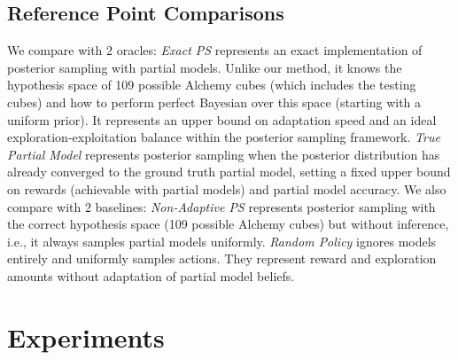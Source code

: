 \documentclass[sigconf]{aamas}
\begin{document}
\subsection{Reference Point Comparisons}\label{sec:refer-point-comp}
We compare with 2 oracles: \textit{Exact PS} represents an exact implementation of posterior sampling with partial models. Unlike our method, it knows the hypothesis space of 109 possible Alchemy cubes (which includes the testing cubes) and how to perform perfect Bayesian over this space (starting with a uniform prior). It represents an upper bound on adaptation speed and an ideal exploration-exploitation balance within the posterior sampling framework. \textit{True Partial Model} represents posterior sampling when the posterior distribution has already converged to the ground truth partial model, setting a fixed upper bound on rewards (achievable with partial models) and partial model accuracy.
We also compare with 2 baselines: \textit{Non-Adaptive PS} represents posterior sampling with the correct hypothesis space (109 possible Alchemy cubes) but without inference, i.e., it always samples partial models uniformly. \textit{Random Policy} ignores models entirely and uniformly samples actions. They represent reward and exploration amounts without adaptation of partial model beliefs.
\section{Experiments}\label{sec:experiments}
\end{document}
